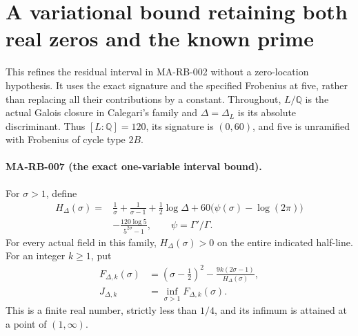 \section{A variational bound retaining both real zeros and the known prime}
\label{sec:s5-variational-endpoint}

This refines the residual interval in MA-RB-002 without a
zero-location hypothesis.  It uses the exact signature and the
specified Frobenius at five, rather than replacing all their
contributions by a constant.  Throughout, \(L/\mathbb Q\) is
the actual Galois closure in Calegari's family and
\(\Delta=\Delta_L\) is its absolute discriminant.
Thus \([L:\mathbb Q]=120\), its signature is \((0,60)\),
and five is unramified with Frobenius of cycle type \(2B\).

\paragraph{MA-RB-007 (the exact one-variable interval bound).}
For \(\sigma>1\), define
\[
 \begin{split}
 H_\Delta(\sigma)={}&\frac1\sigma+\frac1{\sigma-1}
       +\frac12\log\Delta
       +60\bigl(\psi(\sigma)-\log(2\pi)\bigr)\\
       &-\frac{120\log5}{5^{2\sigma}-1},
       \qquad \psi=\Gamma'/\Gamma .
 \end{split}
 \tag{MA-RB.71}
\]
For every actual field in this family, \(H_\Delta(\sigma)>0\)
on the entire indicated half-line.  For an integer \(k\ge1\), put
\[
 \begin{aligned}
 F_{\Delta,k}(\sigma)
    &=(\sigma-\tfrac12)^2
          -\frac{9k(2\sigma-1)}{H_\Delta(\sigma)},\\
 J_{\Delta,k}&=\inf_{\sigma>1}F_{\Delta,k}(\sigma).
 \end{aligned}
 \tag{MA-RB.72}
\]
This is a finite real number, strictly less than \(1/4\),
and its infimum is attained at a point of \((1,\infty)\).

